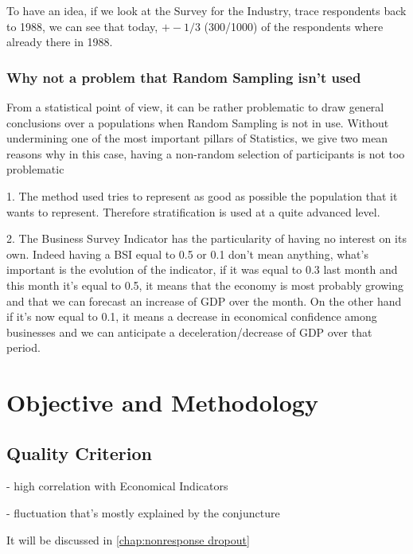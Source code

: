 \documentclass[12pt,a4paper,oneside]{book}
\begin{document}
To have an idea, if we look at the Survey for the Industry, trace respondents back to 1988, we can see that today, $ +-1/3$ (300/1000) of the respondents where already there in 1988. 


\subsubsection*{Why not a problem that Random Sampling isn't used}

From a statistical point of view, it can be rather problematic to draw general conclusions over a populations when Random Sampling is not in use.
Without undermining one of the most important pillars of Statistics, we give two mean reasons why in this case, having a non-random selection of participants is not too problematic

1. The method used tries to represent as good as possible the population that it wants to represent. Therefore stratification is used at a quite advanced level.
 
2. The Business Survey Indicator has the particularity of having no interest on its own. Indeed having a BSI equal to 0.5 or 0.1 don't mean anything, what's important is the evolution of the indicator, if it was equal to 0.3 last month and this month it's equal to 0.5, it means that the economy is most probably growing and that we can forecast an increase of GDP over the month. On the other hand if it's now equal to 0.1, it means a decrease in economical confidence among businesses and we can anticipate a deceleration/decrease of GDP over that period.


\newpage

\section{Objective and Methodology}
\label{section:Objective}


\subsection{Quality Criterion}
- high correlation with Economical Indicators

- fluctuation that's mostly explained by the conjuncture

It will be discussed in \autoref{chap:nonresponse dropout} 
\end{document}
